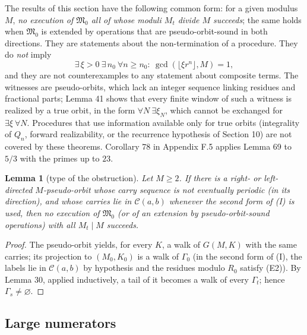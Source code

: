 \documentclass[11pt,reqno]{amsart}
\newtheorem{lemma}[theorem]{Lemma}
\theoremstyle{definition}
\theoremstyle{remark}
\begin{document}
The results of this section have the following common form: for a given
modulus \(M\), \emph{no execution of \(\mathfrak M_0\) all of whose moduli
\(M_t\) divide \(M\) succeeds}; the same holds when \(\mathfrak M_0\) is
extended by operations that are pseudo-orbit-sound in both directions.
They are statements about the non-termination of a procedure. They do
\emph{not} imply
\[
\exists\,\xi>0\ \exists\,n_0\ \forall n\ge n_0:\ \gcd(\lfloor\xi r^n\rfloor,M)=1,
\]
and they are not counterexamples to any statement about composite terms.
The witnesses are pseudo-orbits, which lack an integer sequence linking
residues and fractional parts; Lemma 41 shows that every finite window
of such a witness is realized by a true orbit, in the form
\(\forall N\ \exists\xi_N\), which cannot be exchanged for
\(\exists\xi\ \forall N\). Procedures that use information available only
for true orbits (integrality of \(Q_n\), forward realizability, or the
recurrence hypothesis of Section 10) are not covered by these theorems.
Corollary 78 in Appendix F.5 applies Lemma 69 to \(5/3\) with the primes
up to \(23\).

\begin{samepage}
\begin{lemma}[type of the obstruction]\leavevmode\label{thm:38}
Let \(M\ge2\). If there is a
right- or left-directed \(M\)-pseudo-orbit whose carry sequence is not
eventually periodic (in its direction), and whose carries lie in
\(\mathcal C(a,b)\) whenever the second form of (I) is used, then no
execution of \(\mathfrak M_0\) (or of an extension by pseudo-orbit-sound
operations) with all \(M_t\mid M\) succeeds.
\label{thm-end:38}
\end{lemma}
\end{samepage}

\begin{proof}\leavevmode\label{proof:38}
The pseudo-orbit yields, for every \(K\), a walk of
\(G(M,K)\) with the same carries; its projection to \((M_0,K_0)\) is a
walk of \(\Gamma_0\) (in the second form of (I), the labels lie in
\(\mathcal C(a,b)\) by hypothesis and the residues modulo \(R_0\) satisfy
(E2)). By Lemma 30, applied inductively, a tail of it becomes a walk of
every \(\Gamma_t\); hence \(\Gamma_s\ne\varnothing\). \qedhere
\end{proof}

\subsection{Large numerators}\label{sec:8.1}
\end{document}
